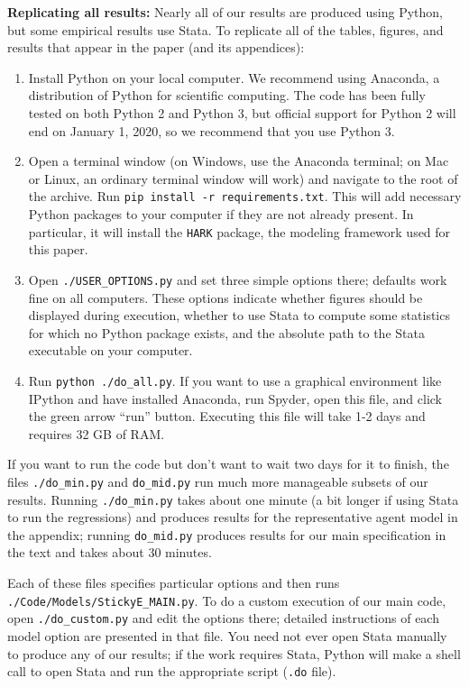 \documentclass[12pt,pdftex,letterpaper]{article}
\begin{document}
\noindent \textbf{Replicating all results:} Nearly all of our results are produced using Python, but some empirical results use Stata.  To replicate all of the tables, figures, and results that appear in the paper (and its appendices):
\begin{enumerate}
\item Install Python on your local computer.  We recommend using Anaconda, a distribution of Python for scientific computing.  The code has been fully tested on both Python 2 and Python 3, but official support for Python 2 will end on January 1, 2020, so we recommend that you use Python 3.

\item Open a terminal window (on Windows, use the Anaconda terminal; on Mac or Linux, an ordinary terminal window will work) and navigate to the root of the archive.  Run \texttt{pip install -r requirements.txt}.  This will add necessary Python packages to your computer if they are not already present.  In particular, it will install the \texttt{HARK} package, the modeling framework used for this paper.

\item Open \texttt{./USER\_OPTIONS.py} and set three simple options there; defaults work fine on all computers.  These options indicate whether figures should be displayed during execution, whether to use Stata to compute some statistics for which no Python package exists, and the absolute path to the Stata executable on your computer.

\item Run \texttt{python ./do\_all.py}.  If you want to use a graphical environment like IPython and have installed Anaconda, run Spyder, open this file, and click the green arrow ``run'' button.  Executing this file will take 1-2 days and requires 32 GB of RAM.
\end{enumerate}


If you want to run the code but don't want to wait two days for it to finish, the files \texttt{./do\_min.py} and \texttt{do\_mid.py} run much more manageable subsets of our results.  Running \texttt{./do\_min.py} takes about one minute (a bit longer if using Stata to run the regressions) and produces results for the representative agent model in the appendix; running \texttt{do\_mid.py} produces results for our main specification in the text and takes about 30 minutes.

Each of these files specifies particular options and then runs \texttt{./Code/Models/StickyE\_MAIN.py}.  To do a custom execution of our main code, open \texttt{./do\_custom.py} and edit the options there; detailed instructions of each model option are presented in that file.  You need not ever open Stata manually to produce any of our results; if the work requires Stata, Python will make a shell call to open Stata and run the appropriate script (\texttt{.do} file).
\end{document}
